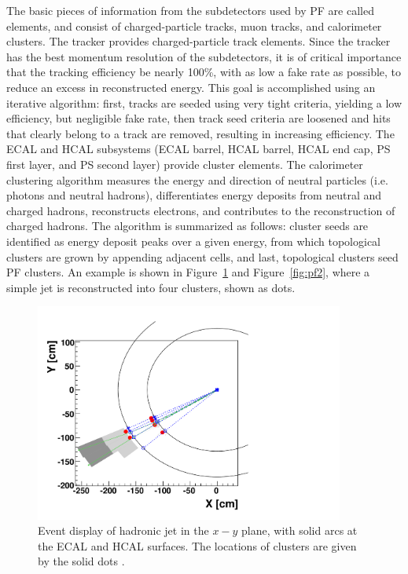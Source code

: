 \indent The basic pieces of information from the subdetectors used by PF are called elements, and consist of charged-particle tracks, muon tracks, and calorimeter clusters. The tracker provides charged-particle track elements. Since the tracker has the best momentum resolution of the subdetectors, it is of critical importance that the tracking efficiency be nearly 100\%, with as low a fake rate as possible, to reduce an excess in reconstructed energy. This goal is accomplished using an iterative algorithm: first, tracks are seeded using very tight criteria, yielding a low efficiency, but negligible fake rate, then track seed criteria are loosened and hits that clearly belong to a track are removed, resulting in increasing efficiency. The ECAL and HCAL subsystems (ECAL barrel, HCAL barrel, HCAL end cap, PS first layer, and PS second layer) provide cluster elements. The calorimeter clustering algorithm measures the energy and direction of neutral particles (i.e. photons and neutral hadrons), differentiates energy deposits from neutral and charged hadrons, reconstructs electrons, and contributes to the reconstruction of charged hadrons. The algorithm is summarized as follows: cluster seeds are identified as energy deposit peaks over a given energy, from which topological clusters are grown by appending adjacent cells, and last, topological clusters seed PF clusters. An example is shown in Figure~\ref{fig:pf1} and Figure~\ref{fig:pf2}, where a simple jet is reconstructed into four clusters, shown as dots. 


\begin{figure}[tbh]
\centering
\includegraphics[width=4in]{figures/PFa.pdf}
\caption{Event display of hadronic jet in the $x-y$ plane, with solid arcs at the ECAL and HCAL surfaces. The locations of clusters are given by the solid dots \cite{CMS:2009nxa}.}
\label{fig:pf1}
\end{figure}

